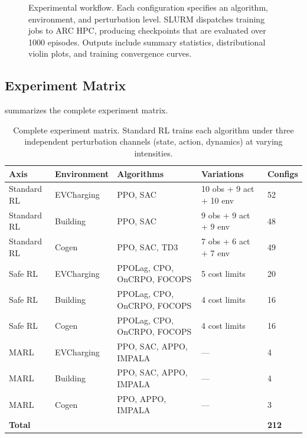 \begin{figure}[htbp]
\caption{Experimental workflow. Each configuration specifies an algorithm, environment, and perturbation level. SLURM dispatches training jobs to ARC HPC, producing checkpoints that are evaluated over 1000 episodes. Outputs include summary statistics, distributional violin plots, and training convergence curves.}
\label{fig:workflow}
\end{figure}

\subsection{Experiment Matrix}
\label{sec:experiment_matrix}

 summarizes the complete experiment matrix.

\begin{table}[htbp]
\centering
\caption{Complete experiment matrix. Standard RL trains each algorithm under three independent perturbation channels (state, action, dynamics) at varying intensities.}
\label{tab:experiment_matrix}
\begin{tabular}{@{}lllll@{}}
\toprule
\textbf{Axis} & \textbf{Environment} & \textbf{Algorithms} & \textbf{Variations} & \textbf{Configs} \\
\midrule
Standard RL & EVCharging & PPO, SAC & 10 obs + 9 act + 10 env & 52 \\
Standard RL & Building & PPO, SAC & 9 obs + 9 act + 9 env & 48 \\
Standard RL & Cogen & PPO, SAC, TD3 & 7 obs + 6 act + 7 env & 49 \\
\addlinespace
Safe RL & EVCharging & PPOLag, CPO, OnCRPO, FOCOPS & 5 cost limits & 20 \\
Safe RL & Building & PPOLag, CPO, OnCRPO, FOCOPS & 4 cost limits & 16 \\
Safe RL & Cogen & PPOLag, CPO, OnCRPO, FOCOPS & 4 cost limits & 16 \\
\addlinespace
MARL & EVCharging & PPO, SAC, APPO, IMPALA & --- & 4 \\
MARL & Building & PPO, SAC, APPO, IMPALA & --- & 4 \\
MARL & Cogen & PPO, APPO, IMPALA & --- & 3 \\
\midrule
\textbf{Total} & & & & \textbf{212} \\
\bottomrule
\end{tabular}
\end{table}

